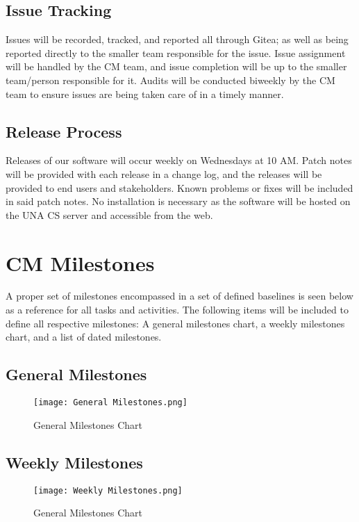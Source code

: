 \documentclass[letterpaper,12pt,oneside,listof=totoc]{scrreprt}
\begin{document}
\subsection{Issue Tracking}

Issues will be recorded, tracked, and reported all through Gitea; as well as being reported directly to the smaller team responsible for the issue. Issue assignment will be handled by the CM team, and issue completion will be up to the smaller team/person responsible for it. Audits will be conducted biweekly by the CM team to ensure issues are being taken care of in a timely manner.

\subsection{Release Process}

Releases of our software will occur weekly on Wednesdays at 10 AM. Patch notes will be provided with each release in a change log, and the releases will be provided to end users and stakeholders. Known problems or fixes will be included in said patch notes. No installation is necessary as the software will be hosted on the UNA CS server and accessible from the web.

\section{CM Milestones}
    A proper set of milestones encompassed in a set of defined baselines is seen below as a reference for all tasks and activities. The following items will be included to define all respective milestones: A general milestones chart, a weekly milestones chart, and a list of dated milestones.
    \subsection{General Milestones}
    \begin{figure}[htbp]
        \centering
        \texttt{[image: General Milestones.png]}
        \caption{General Milestones Chart}
        \label{fig:General Milestones Chart}
    \end{figure}

\clearpage
    \subsection{Weekly Milestones}
        \begin{figure}[htbp]
        \centering
        \texttt{[image: Weekly Milestones.png]}
        \caption{General Milestones Chart}
        \label{fig:General Milestones Chart}
    \end{figure}
\end{document}
